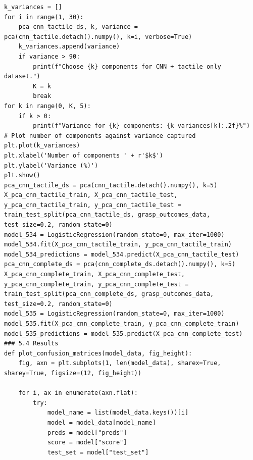 \documentclass[11pt, a4paper]{report}
\begin{document}
\begin{lstlisting}
k_variances = []
for i in range(1, 30):
    pca_cnn_tactile_ds, k, variance = pca(cnn_tactile.detach().numpy(), k=i, verbose=True)
    k_variances.append(variance)
    if variance > 90:
        print(f"Choose {k} components for CNN + tactile only dataset.")
        K = k
        break
for k in range(0, K, 5):
    if k > 0:
        print(f"Variance for {k} components: {k_variances[k]:.2f}%")
# Plot number of components against variance captured
plt.plot(k_variances)
plt.xlabel('Number of components ' + r'$k$')
plt.ylabel('Variance (%)')
plt.show()
pca_cnn_tactile_ds = pca(cnn_tactile.detach().numpy(), k=5)
X_pca_cnn_tactile_train, X_pca_cnn_tactile_test, y_pca_cnn_tactile_train, y_pca_cnn_tactile_test = train_test_split(pca_cnn_tactile_ds, grasp_outcomes_data, test_size=0.2, random_state=0)
model_534 = LogisticRegression(random_state=0, max_iter=1000)
model_534.fit(X_pca_cnn_tactile_train, y_pca_cnn_tactile_train)
model_534_predictions = model_534.predict(X_pca_cnn_tactile_test)
pca_cnn_complete_ds = pca(cnn_complete_ds.detach().numpy(), k=5)
X_pca_cnn_complete_train, X_pca_cnn_complete_test, y_pca_cnn_complete_train, y_pca_cnn_complete_test = train_test_split(pca_cnn_complete_ds, grasp_outcomes_data, test_size=0.2, random_state=0)
model_535 = LogisticRegression(random_state=0, max_iter=1000)
model_535.fit(X_pca_cnn_complete_train, y_pca_cnn_complete_train)
model_535_predictions = model_535.predict(X_pca_cnn_complete_test)
### 5.4 Results
def plot_confusion_matrices(model_data, fig_height):
    fig, axn = plt.subplots(1, len(model_data), sharex=True, sharey=True, figsize=(12, fig_height))

    for i, ax in enumerate(axn.flat):
        try:
            model_name = list(model_data.keys())[i]
            model = model_data[model_name]
            preds = model["preds"]
            score = model["score"]
            test_set = model["test_set"]


\end{lstlisting}
\end{document}
